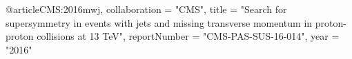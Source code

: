 @article{CMS:2016mwj,
    collaboration = "CMS",
    title = "{Search for supersymmetry in events with jets and missing transverse momentum
in proton-proton collisions at 13 TeV}",
    reportNumber = "CMS-PAS-SUS-16-014",
    year = "2016"
}

